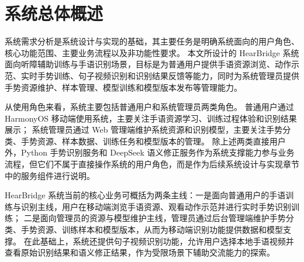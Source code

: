 
\section{系统总体概述}

系统需求分析是系统设计与实现的基础，其主要任务是明确系统面向的用户角色、核心功能范围、主要业务流程以及非功能性要求。
本文所设计的 HearBridge 系统面向听障辅助训练与手语识别场景，目标是为普通用户提供手语资源浏览、动作示范、实时手势训练、句子视频识别和识别结果反馈等能力，同时为系统管理员提供手势资源维护、样本管理、模型训练和模型版本发布等管理能力。

从使用角色来看，系统主要包括普通用户和系统管理员两类角色。
普通用户通过 HarmonyOS 移动端使用系统，主要关注手语资源学习、训练过程体验和识别结果展示；
系统管理员通过 Web 管理端维护系统资源和识别模型，主要关注手势分类、手势资源、样本数据、训练任务和模型版本的管理。
除上述两类直接用户外，Python 手势识别服务和 DeepSeek 语义修正服务作为系统支撑能力参与业务流程，但它们不属于直接操作系统的用户角色，而是作为后续系统设计与实现章节中的服务组件进行说明。

HearBridge 系统当前的核心业务可概括为两条主线：一是面向普通用户的手语训练与识别主线，用户在移动端浏览手语资源、观看动作示范并进行实时手势识别训练；
二是面向管理员的资源与模型维护主线，管理员通过后台管理端维护手势分类、手势资源、训练样本和模型版本，从而为移动端识别功能提供数据和模型支撑。
在此基础上，系统还提供句子视频识别功能，允许用户选择本地手语视频并查看原始识别结果和语义修正结果，作为受限场景下辅助交流能力的探索。
